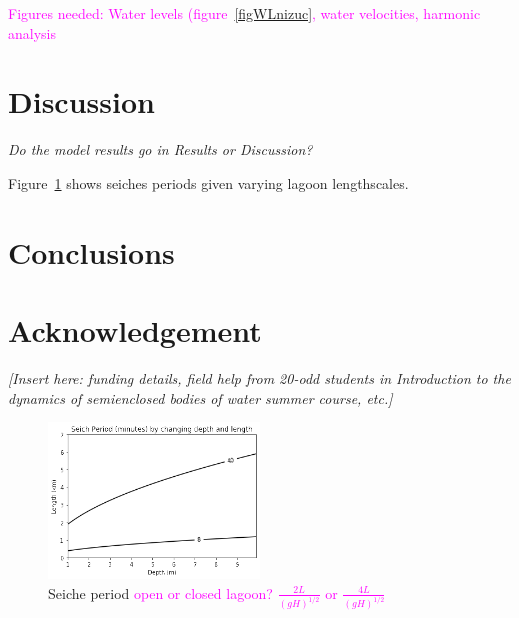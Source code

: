 \documentclass[11pt]{article}
\begin{document}
\textcolor{magenta}{Figures needed: Water levels (figure~\ref{figWLnizuc}, water velocities, harmonic analysis}



\section{Discussion}

\textit{Do the model results go in Results or Discussion?}

Figure~\ref{figSeiche} shows seiches periods given varying lagoon lengthscales. 




\section{Conclusions}


\section{Acknowledgement}

\textit{[Insert here: funding details, field help from 20-odd students in Introduction to the dynamics of semienclosed bodies of water summer course, etc.]}



{}


\begin{figure}[ht!]
\centerline{\includegraphics[width=0.5\textwidth]{images/nichupteseiche.png}}

\internallinenumbers\caption{Seiche period \textcolor{magenta}{open or closed lagoon? $\frac{2 L}{\left(gH\right)^{1/2}}$ or $\frac{4 L}{\left(gH\right)^{1/2}}$}}
\label{figSeiche}
\end{figure}
\end{document}
